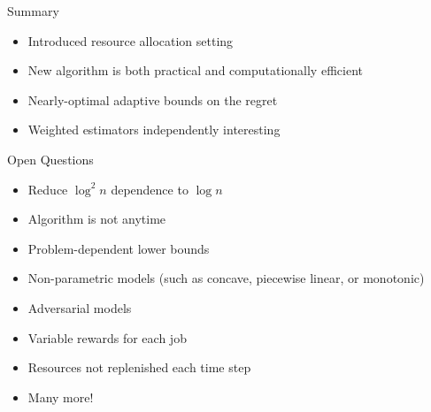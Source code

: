 \documentclass[nofooter,landscape,scale=1.4]{poster}
\begin{document}
\begin{frame}
\begin{textblock}{25.33}
\begin{block}{Summary}
\begin{itemize}
\item Introduced resource allocation setting
\item New algorithm is both practical and computationally efficient
\item Nearly-optimal adaptive bounds on the regret
\item Weighted estimators independently interesting
\end{itemize}
\end{block}

\begin{block}{Open Questions}
\begin{itemize}
\item Reduce $\log^2 n$ dependence to $\log n$
\item Algorithm is not anytime
\item Problem-dependent lower bounds
\item Non-parametric models (such as concave, piecewise linear, or monotonic)
\item Adversarial models
\item Variable rewards for each job
\item Resources not replenished each time step
\item Many more!
\end{itemize}
\end{block}

\end{textblock}




\end{frame}
\end{document}
